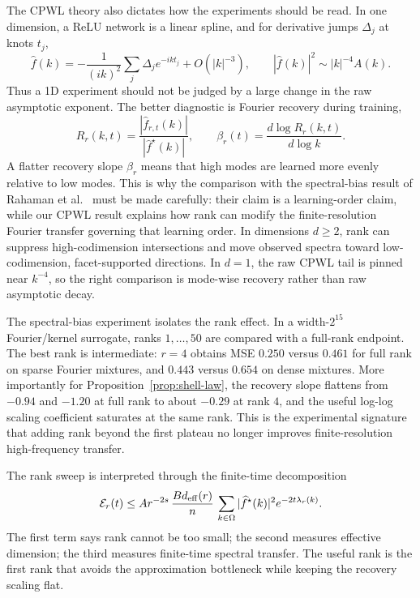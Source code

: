 \documentclass{article}
\newcommand{\calE}{\mathcal{E}}
\newcommand{\wh}{\widehat}
\begin{document}
The CPWL theory also dictates how the experiments should be read. In one dimension, a ReLU network is a linear spline, and for derivative jumps $\Delta_j$ at knots $t_j$,
\begin{equation}
\wh f(k)=
-\frac{1}{(ik)^2}\sum_j \Delta_j e^{-ikt_j}
+O(|k|^{-3}),
\qquad
|\wh f(k)|^2\sim |k|^{-4}A(k).
\end{equation}
Thus a 1D experiment should not be judged by a large change in the raw asymptotic exponent. The better diagnostic is Fourier recovery during training,
\begin{equation}
R_r(k,t)=\frac{|\wh f_{r,t}(k)|}{|\wh f^\star(k)|},
\qquad
\beta_r(t)=\frac{d\log R_r(k,t)}{d\log k}.
\end{equation}
A flatter recovery slope $\beta_r$ means that high modes are learned more evenly relative to low modes. This is why the comparison with the spectral-bias result of Rahaman et al.~\cite{rahaman2019} must be made carefully: their claim is a learning-order claim, while our CPWL result explains how rank can modify the finite-resolution Fourier transfer governing that learning order. In dimensions $d\ge2$, rank can suppress high-codimension intersections and move observed spectra toward low-codimension, facet-supported directions. In $d=1$, the raw CPWL tail is pinned near $k^{-4}$, so the right comparison is mode-wise recovery rather than raw asymptotic decay.

The spectral-bias experiment isolates the rank effect. In a width-$2^{15}$ Fourier/kernel surrogate, ranks $1,\ldots,50$ are compared with a full-rank endpoint. The best rank is intermediate: $r=4$ obtains MSE $0.250$ versus $0.461$ for full rank on sparse Fourier mixtures, and $0.443$ versus $0.654$ on dense mixtures. More importantly for Proposition~\ref{prop:shell-law}, the recovery slope flattens from $-0.94$ and $-1.20$ at full rank to about $-0.29$ at rank $4$, and the useful log-log scaling coefficient saturates at the same rank. This is the experimental signature that adding rank beyond the first plateau no longer improves finite-resolution high-frequency transfer.

The rank sweep is interpreted through the finite-time decomposition
\begin{equation}
\calE_r(t)\le
A r^{-2s}
\,
\frac{B d_{\rm eff}(r)}{n}
\,
\sum_{k\in\Omega}|\wh f^\star(k)|^2 e^{-2t\lambda_r(k)}.
\label{eq:rank-risk}
\end{equation}
The first term says rank cannot be too small; the second measures effective dimension; the third measures finite-time spectral transfer. The useful rank is the first rank that avoids the approximation bottleneck while keeping the recovery scaling flat.
\end{document}
